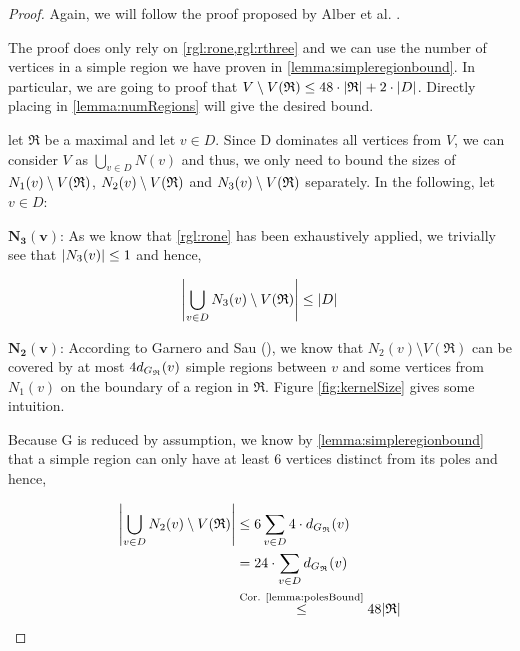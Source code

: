 \begin{proof}
    Again, we will follow the proof proposed by Alber et al. \cite[Proposition 2]{Alber2004}. 
    
    The proof does only rely on \cref{rgl:rone,rgl:rthree} and we can use the number of vertices in a simple region we have proven in \cref{lemma:simpleregionbound}. In particular, we are going to proof that $V \setminus V(\mathfrak{R}) \leq 48 \cdot \abs{\mathfrak{R}} + 2 \cdot \abs{D}$. Directly placing in \cref{lemma:numRegions} will give the desired bound.
    
    let $\mathfrak{R}$ be a maximal \dreg and let $v \in D$. Since D dominates all vertices from $V$, we can consider $V$ as $\bigcup_{v \in D}N(v)$ and thus, we only need to bound the sizes of $N_1(v)\setminus {V(\mathfrak{R})} $, $N_2(v) \setminus {V(\mathfrak{R})} $ and $N_3(v) \setminus {V(\mathfrak{R})} $ separately. In the following, let $v \in D$:
    
    \noindent$\mathbf{N_3(v)}$: As we know that \cref{rgl:rone} has been exhaustively applied, we trivially see that $\abs{N_3(v)} \leq 1$ and hence, 
    
    \[\abs{\bigcup_{v \in D}N_3(v) \setminus V(\mathfrak{R})} \leq \abs{D}\]
    
    \noindent$\mathbf{N_2(v)}$: According to Garnero and Sau (\cite[Proposition 2]{Garnero2018}), we know that $N_2(v) \setminus V(\mathfrak{R})$ can be covered by at most $4 d_{G_{\mathfrak{R}}}(v)$ simple regions between $v$ and some vertices from $N_1(v)$ on the boundary of a region in $\mathfrak{R}$. Figure \ref{fig:kernelSize} gives some intuition.
    
    Because G is reduced by assumption, we know by \cref{lemma:simpleregionbound} that a simple region can only have at least 6 vertices distinct from its poles and hence,
    
    \begin{equation}
        \begin{split}
            \abs{\bigcup_{v \in D} N_2(v) \setminus V(\mathfrak{R})} &\leq 6 \sum_{v \in D}4 \cdot d_{G_{\mathfrak{R}}}(v) \\
            &= 24 \cdot \sum_{v \in D}d_{G_{\mathfrak{R}}}(v) \\
            &\overset{\text{Cor. \ref{lemma:polesBound}}}{\leq} 48 \abs{\mathfrak{R}}
        \end{split}
    \end{equation}
    

\end{proof}
